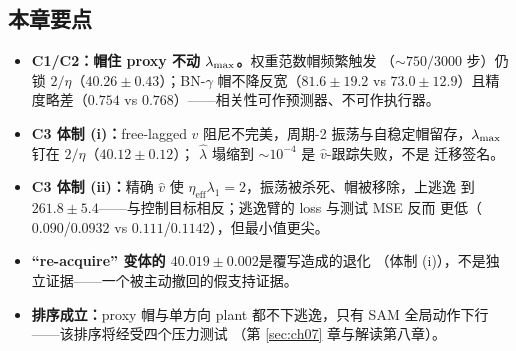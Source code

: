 \subsection*{本章要点}
\begin{itemize}
  \item \textbf{C1/C2：帽住 proxy 不动 $\lambda_{\max}$。}权重范数帽频繁触发
        （$\sim750/3000$ 步）仍锁 $2/\eta$（$40.26\pm0.43$）；BN-$\gamma$
        帽不降反宽（$81.6\pm19.2$ vs $73.0\pm12.9$）且精度略差（$0.754$
        vs $0.768$）——相关性可作预测器、不可作执行器。
  \item \textbf{C3 体制 (i)：}free-lagged $\hat v$ 阻尼不完美，周期-2
        振荡与自稳定帽留存，$\lambda_{\max}$ 钉在 $2/\eta$（$40.12\pm0.12$）；
        $\hat\lambda$ 塌缩到 $\sim10^{-4}$ 是 $\hat v$-跟踪失败，不是
        迁移签名。
  \item \textbf{C3 体制 (ii)：}精确 $\hat v$ 使
        $\eta_{\mathrm{eff}}\lambda_{1}=2$，振荡被杀死、帽被移除，上逃逸
        到 $261.8\pm5.4$——与控制目标相反；逃逸臂的 loss 与测试 MSE 反而
        更低（$0.090$/$0.0932$ vs $0.111$/$0.1142$），但最小值更尖。
  \item \textbf{``re-acquire'' 变体的 $40.019\pm0.002$}是覆写造成的退化
        （体制 (i)），不是独立证据——一个被主动撤回的假支持证据。
  \item \textbf{排序成立：}proxy 帽与单方向 plant 都不下逃逸，只有 SAM
        全局动作下行——该排序将经受四个压力测试
        （第 \ref{sec:ch07} 章与解读第八章）。
\end{itemize}
